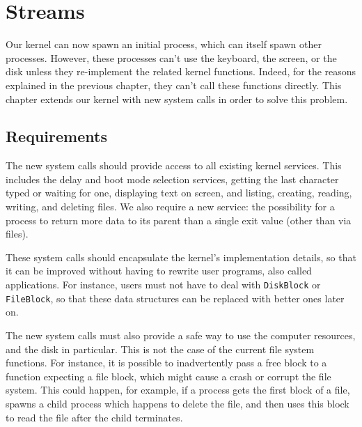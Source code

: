 
\renewcommand{\rustfile}{chapter4}
\setcounter{rustid}{0}


\chapter{Streams}\label{chapter:streams}

Our kernel can now spawn an initial process, which can itself spawn other
processes. However, these processes can't use the keyboard, the screen, or the
disk unless they re-implement the related kernel functions. Indeed, for the
reasons explained in the previous chapter, they can't call these functions
directly. This chapter extends our kernel with new system calls in order to
solve this problem.

\section{Requirements}

The new system calls should provide access to all existing kernel services.
This includes the delay and boot mode selection services, getting the last
character typed or waiting for one, displaying text on screen, and listing,
creating, reading, writing, and deleting files. We also require a new service:
the possibility for a process to return more data to its parent than a single
exit value (other than via files).

These system calls should encapsulate the kernel's implementation details, so
that it can be improved without having to rewrite user programs, also called
applications. For instance, users must not have to deal with {\tt DiskBlock} or
{\tt FileBlock}, so that these data structures can be replaced with better ones
later on.

The new system calls must also provide a safe way to use the computer
resources, and the disk in particular. This is not the case of the current file
system functions. For instance, it is possible to inadvertently pass a free
block to a function expecting a file block, which might cause a crash or
corrupt the file system. This could happen, for example, if a process gets the
first block of a file, spawns a child process which happens to delete the file,
and then uses this block to read the file after the child terminates.

